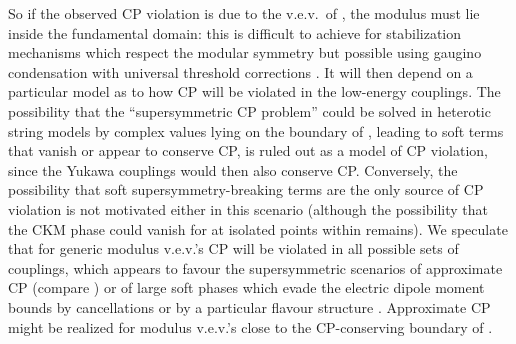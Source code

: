 \documentclass[a4paper,12pt]{article}
\begin{document}
So if the observed CP violation is due to the v.e.v.\ of \coordHE{}, the modulus must lie inside the fundamental domain: this is difficult to achieve for stabilization mechanisms which respect the modular symmetry \cite{CveticFILQ} but possible using gaugino condensation with universal threshold corrections \cite[and references therein]{BailinKL2000}. It will then depend on a particular model as to how CP will be violated in the low-energy couplings. The possibility that the ``supersymmetric CP problem'' could be solved in heterotic string models by complex \coordHE{} values lying on the boundary of \coordHE{} \cite{IbanezLust}, leading to soft terms that vanish or appear to conserve CP, is ruled out as a model of CP violation, since the Yukawa couplings would then also conserve CP. Conversely, the possibility that soft supersymmetry-breaking terms are the only source of CP violation \cite{AbelF,Brhlik2000} is not motivated either in this scenario (although the possibility that the CKM phase could vanish for \coordHE{} at isolated points within \coordHE{} remains). We speculate that for generic modulus v.e.v.'s CP will be violated in all possible sets of couplings, which appears to favour the supersymmetric scenarios of approximate CP (compare \cite{Eyal:1998bk}) or of large soft phases which evade the electric dipole moment bounds by cancellations or by a particular flavour structure \cite{Ibrahim98,BrhlikGK99,Pokorski:2000hz}. Approximate CP might be realized for modulus v.e.v.'s close to the CP-conserving boundary of \coordHE{}.
\end{document}
